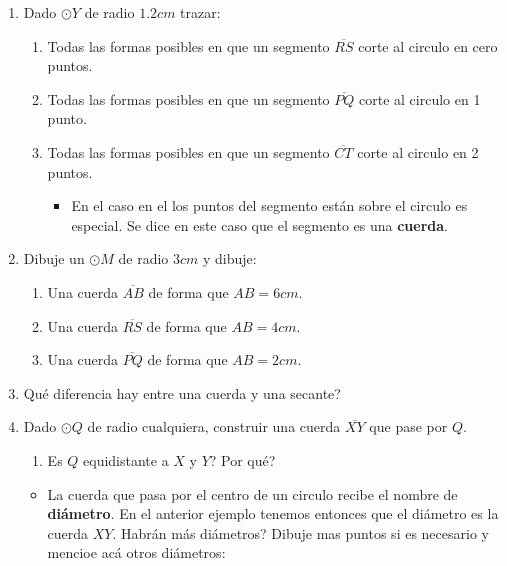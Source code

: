 \begin{act_clase}
\begin{enumerate}
		\item Dado $\odot Y$ de radio $1.2cm$ trazar:
			\begin{enumerate}[label=\Alph*)]
				\item Todas las formas posibles en que un segmento $\overline{RS}$ corte al circulo en cero puntos. \vspace{5cm}
				\item Todas las formas posibles en que un segmento $\overline{PQ}$ corte al circulo en 1 punto. \vspace{5cm}
				\item Todas las formas posibles en que un segmento $\overline{CT}$ corte al circulo en 2 puntos. \vspace{5cm}
				\begin{itemize}
					\item En el caso en el los puntos del segmento están sobre el circulo es especial. Se dice en este caso que el segmento es una \textbf{cuerda}. 
				\end{itemize}
			\end{enumerate}
		\item Dibuje un $\odot M$ de radio $3cm$ y dibuje:
				\begin{enumerate}[label=\Alph*)]
						\item Una cuerda $\overline{AB}$ de forma que $AB=6cm$.
						\item Una cuerda $\overline{RS}$ de forma que $AB=4cm$.
						\item Una cuerda $\overline{PQ}$ de forma que $AB=2cm$.
				\end{enumerate}
		 		\vspace{8cm}
		 \item Qué diferencia hay entre una cuerda y una secante?\vspace{1.5cm}
		 \item Dado $\odot Q$ de radio cualquiera, construir una cuerda $\overline{XY}$ que pase por $Q$.\vspace{4cm}
			 \begin{enumerate}[label=\Alph*)]
			 		\item Es $Q$ equidistante a $X$ y $Y$? Por qué?\vspace{1.5cm}
			 \end{enumerate}
		 	\begin{itemize}
		 		\item La cuerda que pasa por el centro de un circulo recibe el nombre de \textbf{diámetro}. En el anterior ejemplo tenemos entonces que el diámetro es la cuerda $XY$. Habrán más diámetros? Dibuje mas puntos si es necesario y mencioe acá otros diámetros:\vspace{2cm}
		 		

\end{itemize}
\end{enumerate}
\end{act_clase}
